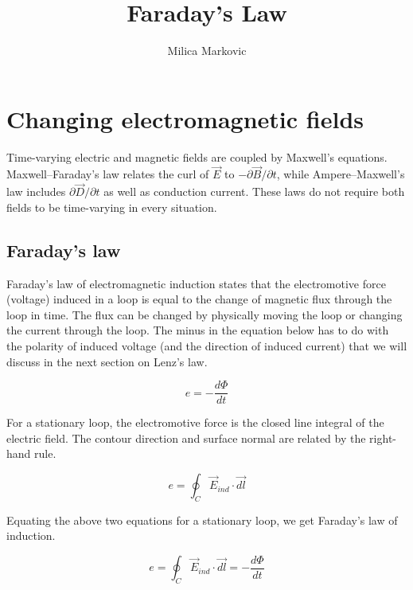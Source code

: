 \documentclass{ximera}
\title{Faraday's Law}
\author{Milica Markovic}
\begin{document}
  
\begin{abstract}  

\end{abstract}  
\maketitle    


\section{Changing electromagnetic fields}

 Time-varying electric and magnetic fields are coupled by Maxwell's equations. Maxwell--Faraday's law relates the curl of $\vec{E}$ to $-\partial\vec{B}/\partial t$, while Ampere--Maxwell's law includes $\partial\vec{D}/\partial t$ as well as conduction current. These laws do not require both fields to be time-varying in every situation.



\subsection{Faraday's law}

Faraday's law of electromagnetic induction states that the electromotive force (voltage) induced in a loop is equal to the change of magnetic flux through the loop in time. The flux can be changed by physically moving the loop or changing the current through the loop. The minus in the equation below has to do with the polarity of induced voltage (and the direction of induced current)  that we will discuss in the next section on Lenz's law.

\begin{equation}
e=-\frac{d\Phi}{dt}
\end{equation}

For a stationary loop, the electromotive force is the closed line integral of the electric field. The contour direction and surface normal are related by the right-hand rule.

\begin{equation}
e=\oint_C \vec{E}_{ind} \cdot \vec{dl}
\end{equation}


Equating the above two equations for a stationary loop, we get Faraday's law of induction.


\begin{equation}
e=\oint_C \vec{E}_{ind} \cdot \vec{dl} =-\frac{d\Phi}{dt}
\end{equation}
\end{document}
